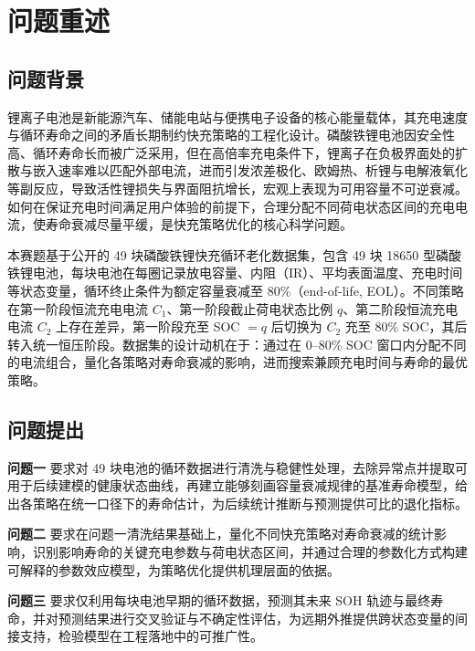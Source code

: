 \documentclass[withoutpreface]{cumcmthesis}
\begin{document}
\section{问题重述}

\subsection{问题背景}

锂离子电池是新能源汽车、储能电站与便携电子设备的核心能量载体，其充电速度与循环寿命之间的矛盾长期制约快充策略的工程化设计。磷酸铁锂电池因安全性高、循环寿命长而被广泛采用，但在高倍率充电条件下，锂离子在负极界面处的扩散与嵌入速率难以匹配外部电流，进而引发浓差极化、欧姆热、析锂与电解液氧化等副反应，导致活性锂损失与界面阻抗增长，宏观上表现为可用容量不可逆衰减\cite{gao2017}。如何在保证充电时间满足用户体验的前提下，合理分配不同荷电状态区间的充电电流，使寿命衰减尽量平缓，是快充策略优化的核心科学问题。

本赛题基于公开的 49 块磷酸铁锂快充循环老化数据集，包含 49 块 18650 型磷酸铁锂电池，每块电池在每圈记录放电容量、内阻（IR）、平均表面温度、充电时间等状态变量，循环终止条件为额定容量衰减至 80\%（end-of-life, EOL）。不同策略在第一阶段恒流充电电流 $C_1$、第一阶段截止荷电状态比例 $q$、第二阶段恒流充电电流 $C_2$ 上存在差异，第一阶段充至 SOC $=q$ 后切换为 $C_2$ 充至 80\% SOC，其后转入统一恒压阶段。数据集的设计动机在于：通过在 0--80\% SOC 窗口内分配不同的电流组合，量化各策略对寿命衰减的影响，进而搜索兼顾充电时间与寿命的最优策略。

\subsection{问题提出}

\textbf{问题一} 要求对 49 块电池的循环数据进行清洗与稳健性处理，去除异常点并提取可用于后续建模的健康状态曲线，再建立能够刻画容量衰减规律的基准寿命模型，给出各策略在统一口径下的寿命估计，为后续统计推断与预测提供可比的退化指标。

\textbf{问题二} 要求在问题一清洗结果基础上，量化不同快充策略对寿命衰减的统计影响，识别影响寿命的关键充电参数与荷电状态区间，并通过合理的参数化方式构建可解释的参数效应模型，为策略优化提供机理层面的依据。

\textbf{问题三} 要求仅利用每块电池早期的循环数据，预测其未来 SOH 轨迹与最终寿命，并对预测结果进行交叉验证与不确定性评估，为远期外推提供跨状态变量的间接支持，检验模型在工程落地中的可推广性。
\end{document}
